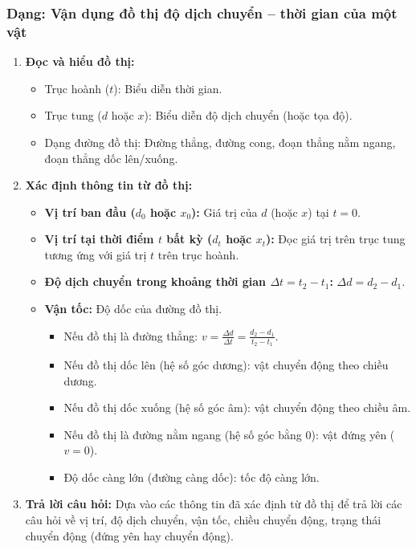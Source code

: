 \subsubsection{Dạng: Vận dụng đồ thị độ dịch chuyển -- thời gian của một vật}
\begin{phuongphap}
\begin{enumerate}
    \item \textbf{Đọc và hiểu đồ thị:}
    \begin{itemize}
        \item Trục hoành ($t$): Biểu diễn thời gian.
        \item Trục tung ($d$ hoặc $x$): Biểu diễn độ dịch chuyển (hoặc tọa độ).
        \item Dạng đường đồ thị: Đường thẳng, đường cong, đoạn thẳng nằm ngang, đoạn thẳng dốc lên/xuống.
    \end{itemize}
    \item \textbf{Xác định thông tin từ đồ thị:}
    \begin{itemize}
        \item \textbf{Vị trí ban đầu ($d_0$ hoặc $x_0$):} Giá trị của $d$ (hoặc $x$) tại $t=0$.
        \item \textbf{Vị trí tại thời điểm $t$ bất kỳ ($d_t$ hoặc $x_t$):} Đọc giá trị trên trục tung tương ứng với giá trị $t$ trên trục hoành.
        \item \textbf{Độ dịch chuyển trong khoảng thời gian $\Delta t = t_2 - t_1$:} $\Delta d = d_2 - d_1$.
        \item \textbf{Vận tốc:} Độ dốc của đường đồ thị.
        \begin{itemize}
            \item Nếu đồ thị là đường thẳng: $v = \frac{\Delta d}{\Delta t} = \frac{d_2 - d_1}{t_2 - t_1}$.
            \item Nếu đồ thị dốc lên (hệ số góc dương): vật chuyển động theo chiều dương.
            \item Nếu đồ thị dốc xuống (hệ số góc âm): vật chuyển động theo chiều âm.
            \item Nếu đồ thị là đường nằm ngang (hệ số góc bằng 0): vật đứng yên ($v=0$).
            \item Độ dốc càng lớn (đường càng dốc): tốc độ càng lớn.
        \end{itemize}
    \end{itemize}
    \item \textbf{Trả lời câu hỏi:} Dựa vào các thông tin đã xác định từ đồ thị để trả lời các câu hỏi về vị trí, độ dịch chuyển, vận tốc, chiều chuyển động, trạng thái chuyển động (đứng yên hay chuyển động).
\end{enumerate}
\end{phuongphap}

